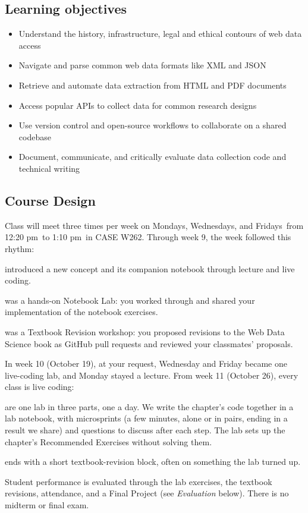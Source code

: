 \documentclass[11pt]{memoir}
\def\classroom{CASE W262}
\def\meetingdays{Mondays, Wednesdays, and Fridays}
\def\starttime{12:20 pm}
\def\endtime{1:10 pm}
\begin{document}
\subsection{Learning objectives}

\begin{itemize}[itemsep=0em]
    \item Understand the history, infrastructure, legal and ethical contours of web data access
    \item Navigate and parse common web data formats like XML and JSON
    \item Retrieve and automate data extraction from HTML and PDF documents
    \item Access popular APIs to collect data for common research designs
    \item Use version control and open-source workflows to collaborate on a shared codebase
    \item Document, communicate, and critically evaluate data collection code and technical writing
\end{itemize}

\subsection{Course Design}
Class will meet three times per week on \meetingdays~from \starttime~to \endtime~in \classroom. Through week 9, the week followed this rhythm:
\begin{description}[itemsep=2pt,labelsep=0.5em,leftmargin=1.5em]
    \item[Monday] introduced a new concept and its companion notebook through lecture and live coding.
    \item[Wednesday] was a hands-on Notebook Lab: you worked through and shared your implementation of the notebook exercises.
    \item[Friday] was a Textbook Revision workshop: you proposed revisions to the Web Data Science book as GitHub pull requests and reviewed your classmates' proposals.
\end{description}
In week 10 (October 19), at your request, Wednesday and Friday became one live-coding lab, and Monday stayed a lecture. From week 11 (October 26), every class is live coding:
\begin{description}[itemsep=2pt,labelsep=0.5em,leftmargin=1.5em]
    \item[Monday, Wednesday, and Friday] are one lab in three parts, one a day. We write the chapter's code together in a lab notebook, with microsprints (a few minutes, alone or in pairs, ending in a result we share) and questions to discuss after each step. The lab sets up the chapter's Recommended Exercises without solving them.
    \item[Friday] ends with a short textbook-revision block, often on something the lab turned up.
\end{description}
Student performance is evaluated through the lab exercises, the textbook revisions, attendance, and a Final Project (see \textit{Evaluation} below). There is no midterm or final exam.
\end{document}
